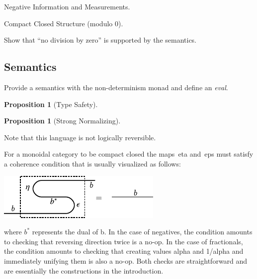 \documentclass[preprint]{sigplanconf}
\newtheorem{proposition}[theorem]{Proposition}
\begin{document}
\begin{multicols}{2}
\begin{center}
\end{center}

\begin{center}
\end{center}  
\end{multicols}

Negative Information and Measurements. 

Compact Closed Structure (modulo 0). 

Show that ``no division by zero'' is supported by the semantics. 

\subsection{Semantics}

Provide a semantics with the non-determinism monad and define an
\emph{eval}.

\begin{proposition}[Type Safety]
  
\end{proposition}

\begin{proposition}[Strong Normalizing]
  
\end{proposition}

Note that this language is not logically reversible. 

For a monoidal category to be compact closed the maps~{{eta}}
and~{{eps}} must satisfy a coherence condition that is usually
visualized as follows:
\begin{center}
  \includegraphics{diagrams/coherence.pdf}
\end{center}
where $b^*$ represents the dual of {{b}}.  In the case of negatives,
the condition amounts to checking that reversing direction twice is a
no-op. In the case of fractionals, the condition amounts to checking
that creating values {{alpha}} and {{1/alpha}} and immediately
unifying them is also a no-op. Both checks are straightforward and are
essentially the constructions in the introduction.
\end{document}
